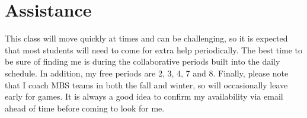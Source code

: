 \documentclass{article}
\begin{document}
\section{Assistance}
This class will move quickly at times and can be challenging, so it is expected that most students will need to come for extra help periodically. The best time to be sure of finding me is during the collaborative periods built into the daily schedule. In addition, my free periods are 2, 3, 4, 7 and 8. Finally, please note that I coach MBS teams in both the fall and winter, so will occasionally leave early for games. It is
always a good idea to confirm my availability via email ahead of time before coming to look for me.


\end{document}
